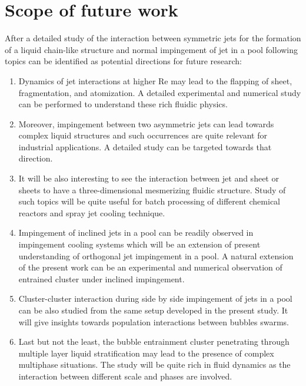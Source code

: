 \section{Scope of future work}
After a detailed study of the interaction between symmetric jets for the formation of a liquid chain-like structure and normal impingement of jet in a pool following topics can be identified as potential directions for future research:
\begin{enumerate}
\item Dynamics of jet interactions at higher Re may lead to the flapping of sheet, fragmentation, and atomization. A detailed experimental and numerical study can be performed to understand these rich fluidic physics.
\item Moreover, impingement between two asymmetric jets can lead towards complex liquid structures and such occurrences are quite relevant for industrial applications. A detailed study can be targeted towards that direction.
\item It will be also interesting to see the interaction between jet and sheet or sheets to have a three-dimensional mesmerizing fluidic structure. Study of such topics will be quite useful for batch processing of different chemical reactors and spray jet cooling technique.
\item Impingement of inclined jets in a pool can be readily observed in impingement cooling systems which will be an extension of present understanding of orthogonal jet impingement in a pool. A natural extension of the present work can be an experimental and numerical observation of entrained cluster under inclined impingement.
\item Cluster-cluster interaction during side by side impingement of jets in a pool can be also studied from the same setup developed in the present study. It will give insights towards population interactions between bubbles swarms.
\item Last but not the least, the bubble entrainment cluster penetrating through multiple layer liquid stratification may lead to the presence of complex multiphase situations. The study will be quite rich in fluid dynamics as the interaction between different scale and phases are involved. 
\end{enumerate}
